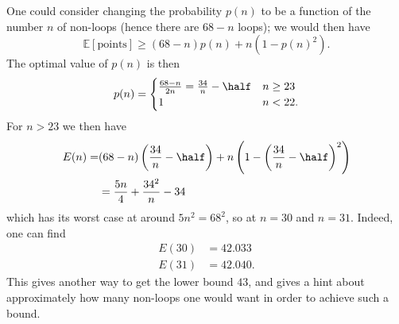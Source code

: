 \documentclass[11pt]{scrartcl}
\begin{document}
\begin{remark*}
  One could consider changing the probability $p(n)$
  to be a function of the number $n$ of non-loops
  (hence there are $68-n$ loops);
  we would then have
  \[ \mathbb E[\text{points}]
    \ge (68-n)p(n) + n(1-p(n)^2). \]
  The optimal value of $p(n)$ is then
  \[
    p(n) = \begin{cases}
      \frac{68-n}{2n} = \frac{34}{n} - \half & n \ge 23 \\
      1 & n < 22.
    \end{cases}
  \]
  For $n > 23$ we then have
  \begin{align*}
    E(n) = & (68-n)\left( \frac{34}{n}-\half \right)
  + n\left( 1-\left( \frac{34}{n}-\half \right)^2 \right) \\
    &= \frac{5n}{4} + \frac{34^2}{n} - 34
  \end{align*}
  which has its worst case at around $5n^2 = 68^2$,
  so at $n=30$ and $n=31$.
  Indeed, one can find
  \begin{align*}
    E(30) &= 42.033 \\
    E(31) &= 42.040.
  \end{align*}
  This gives another way to get the lower bound $43$,
  and gives a hint about approximately how many non-loops
  one would want in order to achieve such a bound.
\end{remark*}
\pagebreak
\end{document}
